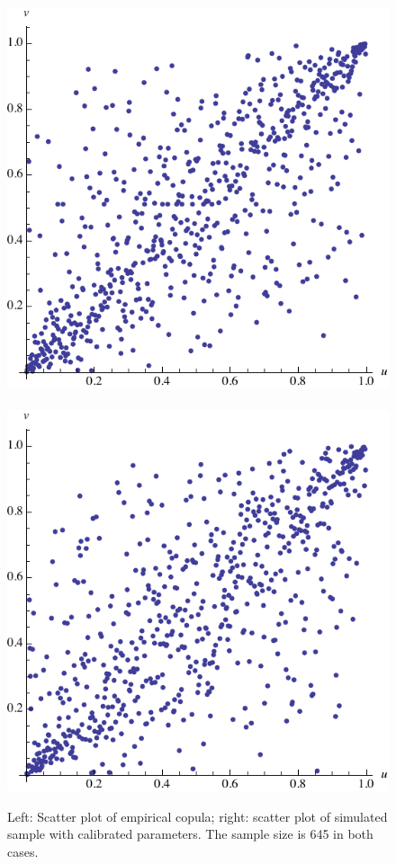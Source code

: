 \begin{figure}[t]
  \centering
  \includegraphics[scale=.5]{_pics/copula_nig1.pdf}\ \ \ \ \ 
  \includegraphics[scale=.5]{_pics/copula_nig2.pdf}
  \caption{Left: Scatter plot of empirical copula; right: scatter plot
    of simulated sample with calibrated parameters. The sample size is
  645 in both cases.}
  \label{fig:copula_nig}
\end{figure}



